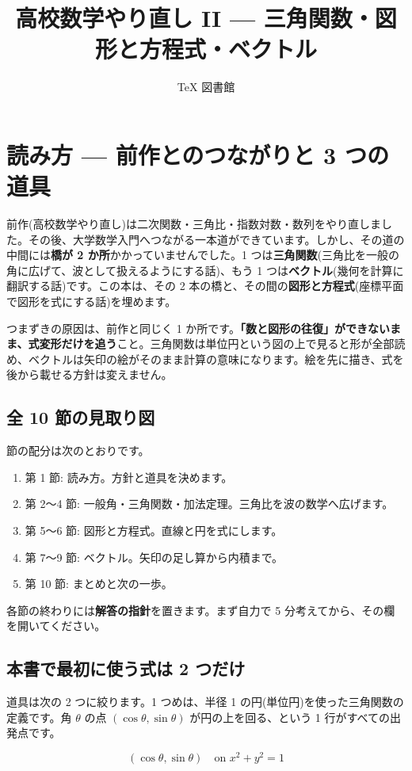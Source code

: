 \documentclass{article}
\title{高校数学やり直し II — 三角関数・図形と方程式・ベクトル}
\author{TeX 図書館}
\begin{document}
\section{読み方 — 前作とのつながりと 3 つの道具}

前作(高校数学やり直し)は二次関数・三角比・指数対数・数列をやり直しました。その後、大学数学入門へつながる一本道ができています。しかし、その道の中間には\textbf{橋が 2 か所}かかっていませんでした。1 つは\textbf{三角関数}(三角比を一般の角に広げて、波として扱えるようにする話)、もう 1 つは\textbf{ベクトル}(幾何を計算に翻訳する話)です。この本は、その 2 本の橋と、その間の\textbf{図形と方程式}(座標平面で図形を式にする話)を埋めます。

つまずきの原因は、前作と同じく 1 か所です。\textbf{「数と図形の往復」ができないまま、式変形だけを追う}こと。三角関数は単位円という図の上で見ると形が全部読め、ベクトルは矢印の絵がそのまま計算の意味になります。絵を先に描き、式を後から載せる方針は変えません。

\subsection{全 10 節の見取り図}

節の配分は次のとおりです。

\begin{enumerate}
\item 第 1 節: 読み方。方針と道具を決めます。
\item 第 2〜4 節: 一般角・三角関数・加法定理。三角比を波の数学へ広げます。
\item 第 5〜6 節: 図形と方程式。直線と円を式にします。
\item 第 7〜9 節: ベクトル。矢印の足し算から内積まで。
\item 第 10 節: まとめと次の一歩。
\end{enumerate}

各節の終わりには\textbf{解答の指針}を置きます。まず自力で 5 分考えてから、その欄を開いてください。

\subsection{本書で最初に使う式は 2 つだけ}

道具は次の 2 つに絞ります。1 つめは、半径 1 の円(単位円)を使った三角関数の定義です。角 \( \theta \) の点 \( (\cos\theta, \sin\theta) \) が円の上を回る、という 1 行がすべての出発点です。

\[ (\cos\theta, \sin\theta) \quad \text{on } x^{2} + y^{2} = 1 \]
\end{document}
